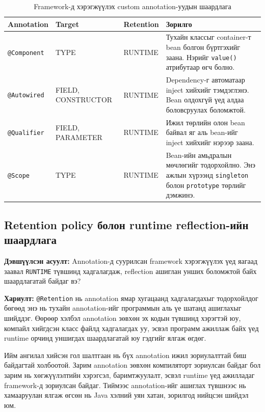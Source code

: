 \begin{table}[H]
\centering
\caption{Framework-д хэрэгжүүлэх custom annotation-уудын шаардлага}
\label{tab:custom-annotations}
\renewcommand{\arraystretch}{1.3}
\begin{tabular}{|p{3cm}|p{2.4cm}|p{2.4cm}|p{6.5cm}|}
\hline
\textbf{Annotation} & \textbf{Target} & \textbf{Retention} & \textbf{Зорилго} \\ \hline
\texttt{@Component} & TYPE & RUNTIME & Тухайн классыг container-т bean болгон бүртгэхийг заана. Нэрийг \texttt{value()} атрибутаар өгч болно. \\ \hline
\texttt{@Autowired} & FIELD, CONSTRUCTOR & RUNTIME & Dependency-г автоматаар inject хийхийг тэмдэглэнэ. Bean олдохгүй үед алдаа боловсруулах боломжтой. \\ \hline
\texttt{@Qualifier} & FIELD, PARAMETER & RUNTIME & Ижил төрлийн олон bean байвал яг аль bean-ийг inject хийхийг нэрээр заана. \\ \hline
\texttt{@Scope} & TYPE & RUNTIME & Bean-ийн амьдралын мөчлөгийг тодорхойлно. Энэ ажлын хүрээнд \texttt{singleton} болон \texttt{prototype} төрлийг дэмжинэ. \\ \hline
\end{tabular}
\end{table}



\subsection{Retention policy болон runtime reflection-ийн шаардлага}

\textbf{Дэвшүүлсэн асуулт:} Annotation-д суурилсан framework хэрэгжүүлэх үед яагаад заавал \texttt{RUNTIME} түвшинд хадгалагдаж, reflection ашиглан унших боломжтой байх шаардлагатай байдаг вэ?

\textbf{Хариулт:} \texttt{@Retention} нь annotation ямар хугацаанд хадгалагдахыг тодорхойлдог бөгөөд энэ нь тухайн annotation-ийг программын аль үе шатанд ашиглахыг шийддэг. Өөрөөр хэлбэл annotation зөвхөн эх кодын түвшинд хэрэгтэй юу, компайл хийгдсэн класс файлд хадгалагдах уу, эсвэл программ ажиллаж байх үед runtime орчинд уншигдах шаардлагатай юу гэдгийг ялгаж өгдөг.


Ийм ангилал хийсэн гол шалтгаан нь бүх annotation ижил зориулалттай биш байдагтай холбоотой. Зарим annotation зөвхөн компиляторт зориулсан байдаг бол зарим нь хөгжүүлэлтийн хэрэгсэл, баримтжуулалт, эсвэл runtime үед ажилладаг framework-д зориулсан байдаг. Тиймээс annotation-ийг ашиглах түвшнээс нь хамааруулан ялгаж өгсөн нь Java хэлний уян хатан, зорилгод нийцсэн шийдэл юм.

